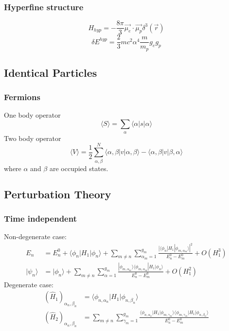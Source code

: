 \documentclass{article}
\newcommand{\ket}[1]{|#1\rangle}
\newcommand{\bra}[1]{\langle #1|}
\begin{document}
\subsubsection{Hyperfine structure}
\begin{equation}
H_{hyp}=-\frac{8\pi}{3}\vec{\mu_e}\cdot\vec{\mu_p}\delta^3(\vec{r})
\end{equation}
\begin{equation}
\delta E^{hyp}=\frac{2}{3}mc^2\alpha^4\frac{m}{m_p}g_eg_p
\end{equation}
\subsection{Identical Particles}
\subsubsection{Fermions}
One body operator
\begin{equation}
\langle S \rangle = \sum_{\alpha}\bra{\alpha}s\ket{\alpha}
\end{equation}
Two body operator
\begin{equation}
\langle V \rangle = 
\frac{1}{2}\sum_{\alpha, \beta}^{N}\bra{\alpha,\beta}v\ket{\alpha,\beta}-\bra{\alpha, \beta}v\ket{\beta,\alpha}
\end{equation}
where $\alpha$ and $\beta$ are occupied states.
\subsection{Perturbation Theory}
\subsubsection{Time independent}
Non-degenerate case:
\begin{align}
E_n &= E_n^0+\bra{\phi_n}H_1\ket{\phi_n}+\sum_{m\ne n}\sum_{\alpha_m=1}^{g_m}\frac{|\bra{\phi_n}H_1\ket{\phi_{m,\alpha_m}}|^2}{E_n^0-E_m^0}+O(H_1^3)\\
\ket{\psi_n}&=\ket{\phi_n}+\sum_{m\ne n}\sum_{\alpha=1}^{g_m}\frac{\ket{\phi_{m,\alpha_m}}\bra{\phi_{m,\alpha_m}}H_1\ket{\phi_n}}{E_n^0-E_m^0}+O(H_1^2)
\end{align}
Degenerate case:
\begin{align}
(\hat H_1)_{\alpha_n, \beta_n}&=\bra{\phi_{n, \alpha_n}}H_1\ket{\phi_{n, \beta_n}}\\
(\hat H_2)_{\alpha_n, \beta_n}&=\sum_{m\ne n}\sum_{\gamma_m=1}^{g_m}\frac{\bra{\phi_{n,\alpha_n}}H_1\ket{\phi_{m,\gamma_m}}\bra{\phi_{m,\gamma_m}}H_1\ket{\phi_{n,\beta_n}}}{E_n^0-E_m^0}
\end{align}
\end{document}
